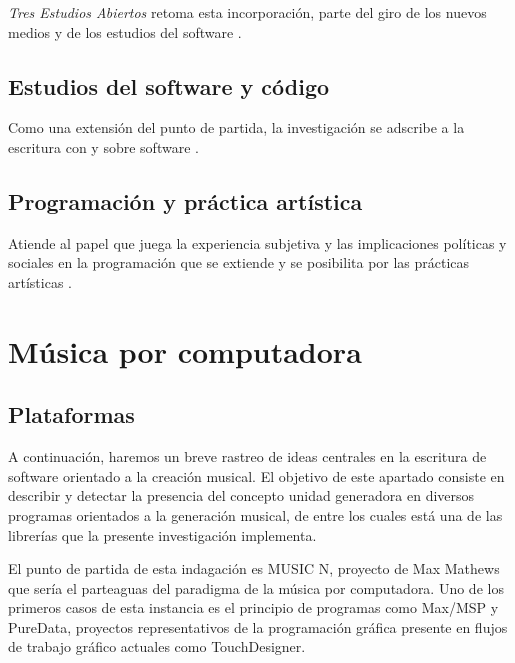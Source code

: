 \textit{Tres Estudios Abiertos} retoma esta incorporación, parte del giro de los nuevos medios y de los estudios del software \citep{manovichlanguage}.

\subsection{Estudios del software y código}

Como una extensión del punto de partida, la investigación se adscribe a la escritura con y sobre software \citep{aestheticProgramming}.

\subsection{Programación y práctica artística}

Atiende al papel que juega la experiencia subjetiva y las implicaciones políticas y sociales en la programación que se extiende y se posibilita por las prácticas artísticas \citep{speakingCode}. 

\section{Música por computadora}



\subsection{Plataformas}

A continuación, haremos un breve rastreo de ideas centrales en la escritura de software orientado a la creación musical. El objetivo de este apartado consiste en describir y detectar la presencia del concepto unidad generadora en diversos programas orientados a la generación musical, de entre los cuales está una de las librerías que la presente investigación implementa.

El punto de partida de esta indagación es MUSIC N, proyecto de Max Mathews que sería el parteaguas del paradigma de la música por computadora. Uno de los primeros casos de esta instancia es el principio de programas como Max/MSP y PureData, proyectos representativos de la programación gráfica presente en flujos de trabajo gráfico actuales como TouchDesigner.

